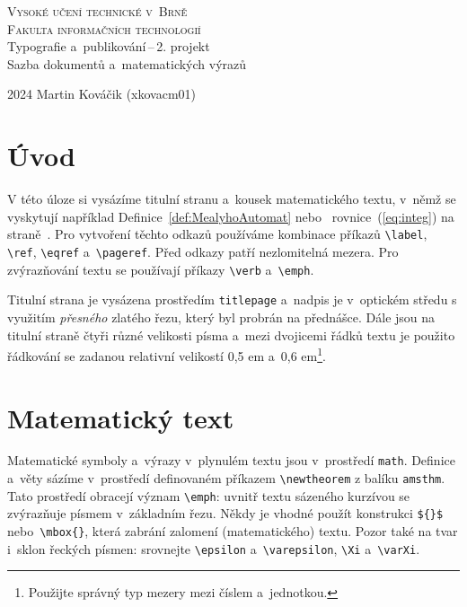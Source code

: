 \documentclass[twocolumn, a4paper, 11pt]{article}
\begin{document}
\begin{titlepage}
    \begin{center}
    \Huge\textsc{Vysoké učení technické v~Brně\\[0.5em]
        \huge Fakulta informačních technologií}\\
        \LARGE Typografie a~publikování\,--\,2. projekt\\[0.6em]
        Sazba dokumentů a~matematických výrazů
    \end{center}
    {\Large 2024 \hfill Martin Kováčik (xkovacm01)}
\end{titlepage}


\section*{Úvod}

V této úloze si vysázíme titulní stranu a~kousek matematického textu, v~němž se vyskytují například Definice~\ref{def:MealyhoAutomat} nebo~ rovnice~(\ref{eq:integ}) na straně~\pageref{def:MealyhoAutomat}. Pro vytvoření těchto odkazů používáme kombinace příkazů \verb|\label|, \verb|\ref|, \verb|\eqref| a~\verb|\pageref|. Před odkazy patří nezlomitelná mezera. Pro zvýrazňování textu se používají příkazy \verb|\verb| a~\verb|\emph|.

Titulní strana je vysázena prostředím \texttt{titlepage} a~nadpis je v~optickém středu s využitím \emph{přesného} zlatého řezu, který byl probrán na přednášce. Dále jsou na titulní straně čtyři různé velikosti písma a~mezi dvojicemi řádků textu je použito řádkování se zadanou relativní velikostí 0{,}5 em a~0{,}6 em\footnote{Použijte správný typ mezery mezi číslem a~jednotkou.}.

\section{Matematický text}

Matematické symboly a~výrazy v~plynulém textu jsou v~prostředí \texttt{math}. Definice a~věty sázíme v~prostředí definovaném příkazem \verb|\newtheorem| z balíku \texttt{amsthm}. Tato prostředí obracejí význam \verb|\emph|: uvnitř textu sázeného kurzívou se zvýrazňuje písmem v~základním řezu. Někdy je vhodné použít konstrukci \verb|${}$| nebo~\verb|\mbox{}|, která zabrání zalomení (matematického) textu. Pozor také na tvar i~sklon řeckých písmen: srovnejte \verb|\epsilon| a~\verb|\varepsilon|, \verb|\Xi| a~\verb|\varXi|.
\end{document}
